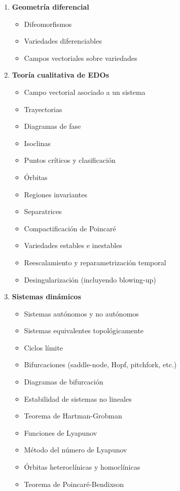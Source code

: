 \begin{enumerate}
    	\item \textbf{Geometría diferencial}
    	\begin{itemize}
    		\item Difeomorfismos
    		\item Variedades diferenciables
    		\item Campos vectoriales sobre variedades
    	\end{itemize}
    	
    	\item \textbf{Teoría cualitativa de EDOs}
    	\begin{itemize}
    		\item Campo vectorial asociado a un sistema \checkmark
    		\item Trayectorias \checkmark
    		\item Diagramas de fase \checkmark
    		\item Isoclinas \checkmark
    		\item Puntos críticos y clasificación \checkmark
    		\item Órbitas
    		\item Regiones invariantes
    		\item Separatrices
    		\item Compactificación de Poincaré
    		\item Variedades estables e inestables
    		\item Reescalamiento y reparametrización temporal
    		\item Desingularización (incluyendo blowing-up)
    	\end{itemize}
    	
    	\item \textbf{Sistemas dinámicos}
    	\begin{itemize}
    		\item Sistemas autónomos y no autónomos \checkmark
    		\item Sistemas equivalentes topológicamente
    		\item Ciclos límite
    		\item Bifurcaciones (saddle-node, Hopf, pitchfork, etc.)
    		\item Diagramas de bifurcación
    		\item Estabilidad de sistemas no lineales
    		\item Teorema de Hartman-Grobman 
    		\item Funciones de Lyapunov
    		\item Método del número de Lyapunov
    		\item Órbitas heteroclínicas y homoclínicas
    		\item Teorema de Poincaré-Bendixson
    	\end{itemize}
    	

\end{enumerate}
